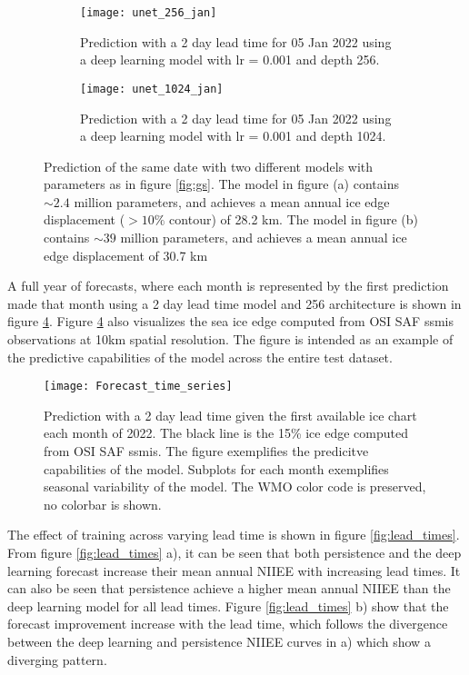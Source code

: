 \documentclass[../main/thesis]{subfiles}
\begin{document}
\begin{figure}
    \centering
    \begin{subfigure}{0.49\textwidth}
        \centering
        \texttt{[image: unet\_256\_jan]}
        \caption{Prediction with a 2 day lead time for 05 Jan 2022 using a deep learning model with lr = 0.001 and depth 256.}
        \label{fig:gs_middle_left}
    \end{subfigure}\hfill
    \begin{subfigure}{0.49\textwidth}
        \centering
        \texttt{[image: unet\_1024\_jan]}
        \caption{Prediction with a 2 day lead time for 05 Jan 2022 using a deep learning model with lr = 0.001 and depth 1024.}
        \label{fig:gs_middle_right}
    \end{subfigure}
    \caption{Prediction of the same date with two different models with parameters as in figure \ref{fig:gs}. The model in figure (a) contains $\sim 2.4$ million parameters, and achieves a mean annual ice edge displacement ($>10\%$ contour) of 28.2 km. The model in figure (b) contains $\sim 39$ million parameters, and achieves a mean annual ice edge displacement of 30.7 km}
    \label{fig:256_1024_compare}
\end{figure}

A full year of forecasts, where each month is represented by the first prediction made that month using a 2 day lead time model and 256 architecture is shown in figure \ref{fig:timeseries}. Figure \ref{fig:timeseries} also visualizes the sea ice edge computed from OSI SAF ssmis observations at 10km spatial resolution. The figure is intended as an example of the predictive capabilities of the model across the entire test dataset. 

\begin{figure}
    \centering
    \texttt{[image: Forecast\_time\_series]}
    \caption{\label{fig:timeseries}Prediction with a 2 day lead time given the first available ice chart each month of 2022. The black line is the 15\% ice edge computed from OSI SAF ssmis. The figure exemplifies the predicitve capabilities of the model. Subplots for each month exemplifies seasonal variability of the model. The WMO color code is preserved, no colorbar is shown.}
\end{figure}

The effect of training across varying lead time is shown in figure \ref{fig:lead_times}. From figure \ref{fig:lead_times} a), it can be seen that both persistence and the deep learning forecast increase their mean annual NIIEE with increasing lead times. It can also be seen that persistence achieve a higher mean annual NIIEE than the deep learning model for all lead times. Figure \ref{fig:lead_times} b) show that the forecast improvement increase with the lead time, which follows the divergence between the deep learning and persistence NIIEE curves in a) which show a diverging pattern. 
\end{document}
